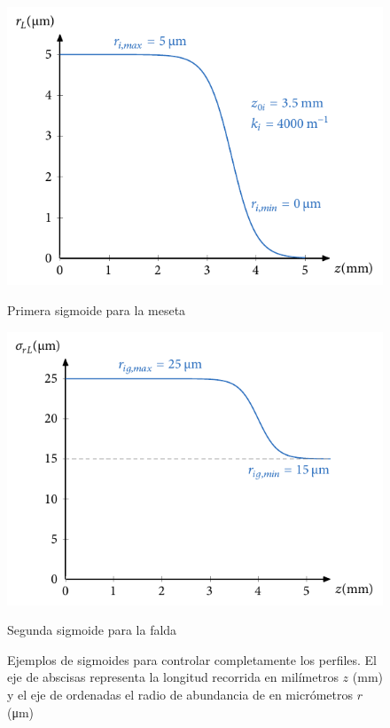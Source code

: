 \begin{figure}[htbp]
  \centering
  \begin{subcaptionblock}{.4\textwidth}
    \centering
    \includegraphics[width=\textwidth]{Figuras/ch4_ejsigm3.pdf}
    \caption{Primera sigmoide para la meseta}\label{fig:ch4_ssigma}
  \end{subcaptionblock}
  \begin{subcaptionblock}{.4\textwidth}
    \centering
    \includegraphics[width=\textwidth]{Figuras/ch4_ejsigm4.pdf}
    \caption{Segunda sigmoide para la falda}\label{fig:ch4_ssigmb}
  \end{subcaptionblock}
   \caption{Ejemplos de sigmoides para controlar completamente los perfiles. El eje de abscisas representa la longitud recorrida en milímetros $z$ (\unit{mm}) y el eje de ordenadas el radio de abundancia de  en micrómetros $r$ (\unit{\um})}
   \label{fig:4.19}
\end{figure}

